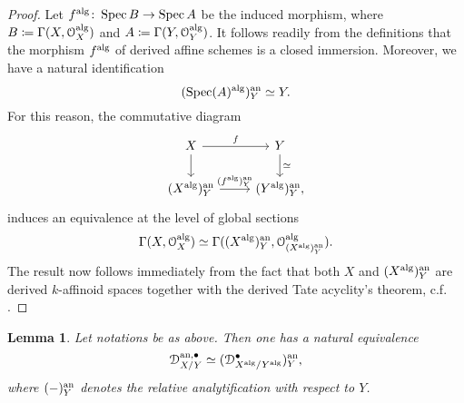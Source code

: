 \documentclass[10pt,a4paper,reqno]{amsart} %
\theoremstyle{plain}
\newtheorem{lem}[thm]{Lemma}
\theoremstyle{definition}
\theoremstyle{remark}
\numberwithin{equation}{section}
\begin{document}
\begin{proof}
    Let $f ^\mathrm{alg} \colon \operatorname{Spec} B \to \operatorname{Spec} A$ be the induced morphism, where $B \coloneqq \Gamma(X, \mathcal O_X^\mathrm{alg})$ and $A \coloneqq \Gamma(Y, \mathcal O_Y^\mathrm{alg})$. It follows readily from the definitions
    that the morphism $f^\mathrm{alg}$ of derived affine schemes is a closed immersion. Moreover,
    we have a natural
    identification
        \[(\operatorname{Spec}(A)^\mathrm{alg})^\mathrm{an}_Y \simeq Y.\]
    For this reason, the commutative diagram
        \[
        \begin{tikzcd}
            X \ar{r}{f} \ar{d} & Y \ar{d}{\simeq} \\
            (X\alg)\an_Y \ar{r}{(f\alg)\an_Y} & (Y\alg)\an_Y,  
        \end{tikzcd}
        \]
    induces
    an equivalence at the level of global sections
        \[
            \Gamma(X, \mathcal O_X^\mathrm{alg}) \simeq \Gamma((X^\mathrm{alg})_Y^\mathrm{an}, \mathcal O_{(X^\mathrm{alg})^\mathrm{an}_Y}^\mathrm{alg}).  
        \]
    The result now follows immediately from the fact that both $X$ and $(X^\mathrm{alg})_Y^\mathrm{an}$ are derived $k$-affinoid spaces together with the derived Tate acyclity's theorem,
    c.f. \cite[Theorem 3.1]{Porta_Yu_Derived_Hom_spaces}.
\end{proof}

\begin{lem} \label{lem:analytification_of_simplicial_object_deformation}
    Let notations be as above. Then one has a natural equivalence
        \[
            \mathcal D_{X/Y}^{\mathrm{an}, \bullet} \simeq (\mathcal D_{X^\mathrm{alg}/ Y^\mathrm{alg}}^\bullet)^\mathrm{an}_Y  ,
        \]
    where $(-)_Y^\mathrm{an}$ denotes the relative analytification with respect to $Y$.
\end{lem}
\end{document}

